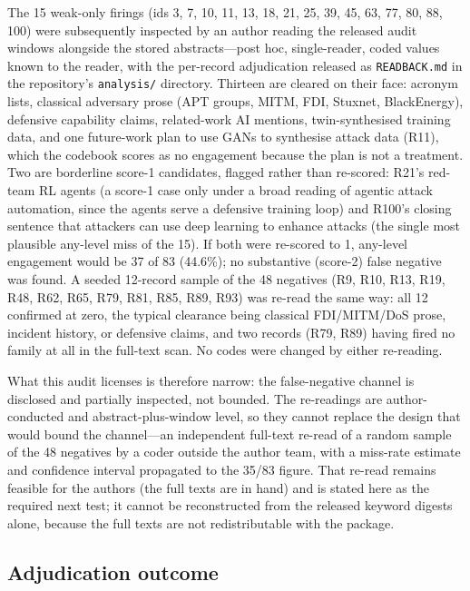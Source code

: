 \documentclass[preprint,12pt]{elsarticle}
\renewcommand{\_}{\plainunderscore\allowbreak}
\begin{document}
The 15 weak-only firings (ids 3, 7, 10, 11, 13, 18, 21, 25, 39, 45, 63, 77, 80, 88, 100)
were subsequently inspected by an author reading the released audit
windows alongside the stored abstracts---post hoc, single-reader, coded values known to the
reader, with the per-record adjudication released as \texttt{READBACK.md} in the
repository's \texttt{analysis/} directory.
Thirteen are cleared on their face: acronym lists, classical adversary prose (APT groups,
MITM, FDI, Stuxnet, BlackEnergy), defensive capability claims, related-work AI mentions,
twin-synthesised training data, and one future-work plan to use GANs to synthesise attack
data (R11), which the codebook scores as no engagement because the plan is not a
treatment. Two are borderline score-1 candidates, flagged rather than re-scored: R21's
red-team RL agents (a score-1 case only under a broad reading of agentic attack
automation, since the agents serve a defensive training loop) and R100's closing sentence
that attackers can use deep learning to enhance attacks (the single most plausible
any-level miss of the 15). If both were re-scored to 1, any-level engagement would be 37
of 83 (44.6\%); no substantive (score-2) false negative was found. A seeded 12-record
sample of the 48 negatives (R9, R10, R13, R19, R48, R62, R65, R79, R81, R85, R89, R93)
was re-read the same way: all 12 confirmed at zero, the typical clearance being classical
FDI/MITM/DoS prose, incident history, or defensive claims, and two records (R79, R89)
having fired no family at all in the full-text scan. No codes were changed by either
re-reading.

What this audit licenses is therefore narrow: the false-negative channel is disclosed
and partially inspected, not bounded. The re-readings are author-conducted and
abstract-plus-window level, so they
cannot replace the design that would bound the channel---an independent full-text re-read
of a random sample of the 48 negatives by a coder outside the author team, with a
miss-rate estimate and confidence interval propagated to the 35/83 figure. That re-read
remains feasible for the authors (the full texts are in hand) and is stated here as the
required next test; it cannot be reconstructed from the released keyword digests alone,
because the full texts are not redistributable with the package.

\subsection{Adjudication outcome}
\end{document}
